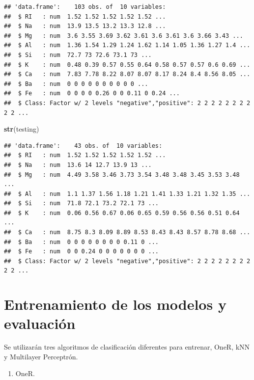 \documentclass[]{article}
\newenvironment{Shaded}{\begin{snugshade}}{\end{snugshade}}
\newcommand{\KeywordTok}[1]{\textcolor[rgb]{0.13,0.29,0.53}{\textbf{#1}}}
\newcommand{\NormalTok}[1]{#1}
\providecommand{\tightlist}{%
  \setlength{\itemsep}{0pt}\setlength{\parskip}{0pt}}
\begin{document}
\newpage

\begin{verbatim}
## 'data.frame':    103 obs. of  10 variables:
##  $ RI   : num  1.52 1.52 1.52 1.52 1.52 ...
##  $ Na   : num  13.9 13.5 13.2 13.3 12.8 ...
##  $ Mg   : num  3.6 3.55 3.69 3.62 3.61 3.6 3.61 3.6 3.66 3.43 ...
##  $ Al   : num  1.36 1.54 1.29 1.24 1.62 1.14 1.05 1.36 1.27 1.4 ...
##  $ Si   : num  72.7 73 72.6 73.1 73 ...
##  $ K    : num  0.48 0.39 0.57 0.55 0.64 0.58 0.57 0.57 0.6 0.69 ...
##  $ Ca   : num  7.83 7.78 8.22 8.07 8.07 8.17 8.24 8.4 8.56 8.05 ...
##  $ Ba   : num  0 0 0 0 0 0 0 0 0 0 ...
##  $ Fe   : num  0 0 0 0 0.26 0 0 0.11 0 0.24 ...
##  $ Class: Factor w/ 2 levels "negative","positive": 2 2 2 2 2 2 2 2 2 2 ...
\end{verbatim}

\begin{Shaded}
\begin{Highlighting}[]
\KeywordTok{str}\NormalTok{(testing)}
\end{Highlighting}
\end{Shaded}

\begin{verbatim}
## 'data.frame':    43 obs. of  10 variables:
##  $ RI   : num  1.52 1.52 1.52 1.52 1.52 ...
##  $ Na   : num  13.6 14 12.7 13.9 13 ...
##  $ Mg   : num  4.49 3.58 3.46 3.73 3.54 3.48 3.48 3.45 3.53 3.48 ...
##  $ Al   : num  1.1 1.37 1.56 1.18 1.21 1.41 1.33 1.21 1.32 1.35 ...
##  $ Si   : num  71.8 72.1 73.2 72.1 73 ...
##  $ K    : num  0.06 0.56 0.67 0.06 0.65 0.59 0.56 0.56 0.51 0.64 ...
##  $ Ca   : num  8.75 8.3 8.09 8.89 8.53 8.43 8.43 8.57 8.78 8.68 ...
##  $ Ba   : num  0 0 0 0 0 0 0 0 0.11 0 ...
##  $ Fe   : num  0 0 0.24 0 0 0 0 0 0 0 ...
##  $ Class: Factor w/ 2 levels "negative","positive": 2 2 2 2 2 2 2 2 2 2 ...
\end{verbatim}

\hypertarget{entrenamiento-de-los-modelos-y-evaluaciuxf3n}{%
\section{Entrenamiento de los modelos y
evaluación}\label{entrenamiento-de-los-modelos-y-evaluaciuxf3n}}

Se utilizarán tres algoritmos de clasificación diferentes para entrenar, OneR, kNN y Multilayer Perceptrón.

\begin{enumerate}
\def\labelenumi{\arabic{enumi}.}
\tightlist
\item
  OneR.
\end{enumerate}
\end{document}
